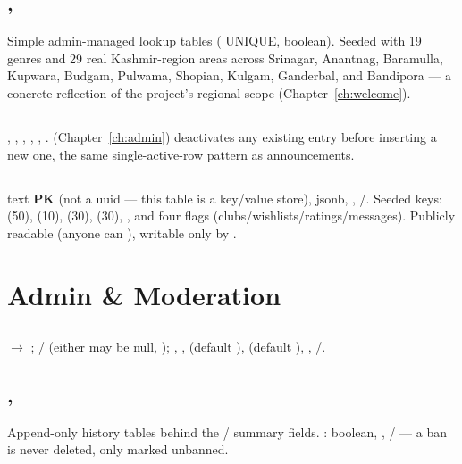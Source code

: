 \subsection*{, }
Simple admin-managed lookup tables ( UNIQUE,  boolean). Seeded with 19 genres and 29 real Kashmir-region areas across Srinagar, Anantnag, Baramulla, Kupwara, Budgam, Pulwama, Shopian, Kulgam, Ganderbal, and Bandipora — a concrete reflection of the project's regional scope (Chapter~\ref{ch:welcome}).

\subsection*{}
, , , , , .  (Chapter~\ref{ch:admin}) deactivates any existing entry before inserting a new one, the same single-active-row pattern as announcements.

\subsection*{}
 text \textbf{PK} (not a uuid — this table is a key/value store),  jsonb, , /. Seeded keys:  (50),  (10),  (30),  (30), , and four  flags (clubs/wishlists/ratings/messages). Publicly readable (anyone can ), writable only by .

\section{Admin \& Moderation}

\subsection*{}
 $\to$ ; / (either may be null, ); , ,  (default ),  (default ), , /.

\subsection*{, }
Append-only history tables behind the / summary fields. :  boolean, , / — a ban is never deleted, only marked unbanned.

